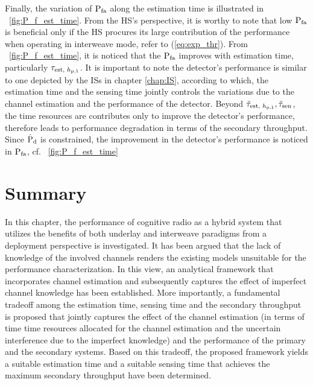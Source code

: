 Finally, the variation of $\text{P}_{\text{fa}}$ along the estimation time is illustrated in \figurename~\ref{fig:P_f_est_time}. From the HS's perspective, it is worthy to note that low $\text{P}_{\text{fa}}$ is beneficial only if the HS procures its large contribution of the performance when operating in interweave mode, refer to (\ref{eq:exp_thr}). From \figurename~\ref{fig:P_f_est_time}, it is noticed that the $\text{P}_{\text{fa}}$ improves with estimation time, particularly $\tau_{\text{est, $h_{\text{p,1}}$}}$. It is important to note the detector's performance is similar to one depicted by the ISs in chapter \ref{chap:IS}, according to which, the estimation time and the sensing time jointly controls the variations due to the channel estimation and the performance of the detector. Beyond $\tilde{\tau}_{\text{est, $h_{\text{p,1}}$}}, \tilde{\tau}_{\text{sen}}$, the time resources are contributes only to improve the detector's performance, therefore leads to performance degradation in terms of the secondary throughput. Since $\hat{\text{P}}_{\text{d}}$ is constrained, the improvement in the detector's performance is noticed in $\text{P}_{\text{fa}}$, cf. \figurename~\ref{fig:P_f_est_time} 

\section{Summary} \label{sec:conc}
In this chapter, the performance of cognitive radio as a hybrid system that utilizes the benefits of both underlay and interweave paradigms from a deployment perspective is investigated. It has been argued that the lack of knowledge of the involved channels renders the existing models unsuitable for the performance characterization. In this view, an analytical framework that incorporates channel estimation and subsequently captures the effect of imperfect channel knowledge has been established. More importantly, a fundamental tradeoff among the estimation time, sensing time and the secondary throughput is proposed that jointly captures the effect of the channel estimation (in terms of time time resources allocated for the channel estimation and the uncertain interference due to the imperfect knowledge) and the performance of the primary and the secondary systems. Based on this tradeoff, the proposed framework yields a suitable estimation time and a suitable sensing time that achieves the maximum secondary throughput have been determined. %

